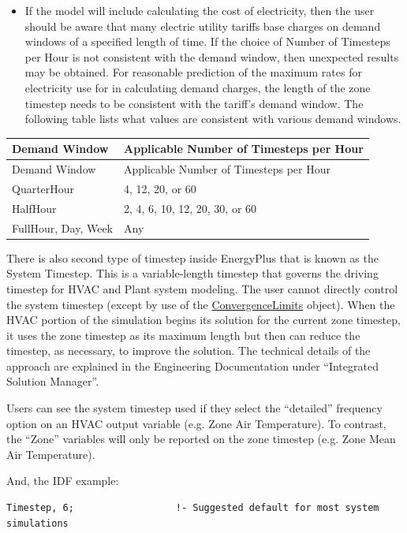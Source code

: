 \begin{itemize}
    \item
    If the model will include calculating the cost of electricity, then the user should be aware that many electric utility tariffs base charges on demand windows of a specified length of time. If the choice of Number of Timesteps per Hour is not consistent with the demand window, then unexpected results may be obtained. For reasonable prediction of the maximum rates for electricity use for in calculating demand charges, the length of the zone timestep needs to be consistent with the tariff's demand window. The following table lists what values are consistent with various demand windows.
\end{itemize}

\begin{longtable}[c]{@{}ll@{}}
    \toprule
    Demand Window & Applicable Number of Timesteps per Hour \tabularnewline
    \midrule
    \endfirsthead

    \toprule
    Demand Window & Applicable Number of Timesteps per Hour \tabularnewline
    \midrule
    \endhead

    QuarterHour & 4, 12, 20, or 60 \tabularnewline
    HalfHour & 2, 4, 6, 10, 12, 20, 30, or 60 \tabularnewline
    FullHour, Day, Week & Any \tabularnewline
    \bottomrule
\end{longtable}

There is also second type of timestep inside EnergyPlus that is known as the System Timestep. This is a variable-length timestep that governs the driving timestep for HVAC and Plant system modeling. The user cannot directly control the system timestep (except by use of the \hyperref[convergencelimits]{ConvergenceLimits} object). When the HVAC portion of the simulation begins its solution for the current zone timestep, it uses the zone timestep as its maximum length but then can reduce the timestep, as necessary, to improve the solution. The technical details of the approach are explained in the Engineering Documentation under ``Integrated Solution Manager''.

Users can see the system timestep used if they select the ``detailed'' frequency option on an HVAC output variable (e.g. Zone Air Temperature). To contrast, the ``Zone'' variables will only be reported on the zone timestep (e.g. Zone Mean Air Temperature).

And, the IDF example:

\begin{lstlisting}
Timestep, 6;                  !- Suggested default for most system simulations
\end{lstlisting}

